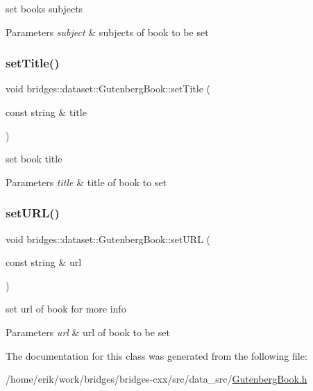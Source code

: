 set book\textquotesingle{}s subjects 
\begin{DoxyParams}{Parameters}
{\em subject} & subjects of book to be set \\
\hline
\end{DoxyParams}
\mbox{\label{classbridges_1_1dataset_1_1_gutenberg_book_a92b2299297a63bb95cb32edb236c29cd}} 
\subsubsection{\texorpdfstring{set\+Title()}{setTitle()}}
{\footnotesize\ttfamily void bridges\+::dataset\+::\+Gutenberg\+Book\+::set\+Title (\begin{DoxyParamCaption}\item[{const string \&}]{title }\end{DoxyParamCaption})\hspace{0.3cm}{\ttfamily [inline]}}

set book title 
\begin{DoxyParams}{Parameters}
{\em title} & title of book to set \\
\hline
\end{DoxyParams}
\mbox{\label{classbridges_1_1dataset_1_1_gutenberg_book_aaa548eeb0e8512f95e3e0ea2bf6d7e9f}} 
\subsubsection{\texorpdfstring{set\+U\+R\+L()}{setURL()}}
{\footnotesize\ttfamily void bridges\+::dataset\+::\+Gutenberg\+Book\+::set\+U\+RL (\begin{DoxyParamCaption}\item[{const string \&}]{url }\end{DoxyParamCaption})\hspace{0.3cm}{\ttfamily [inline]}}

set url of book for more info 
\begin{DoxyParams}{Parameters}
{\em url} & url of book to be set \\
\hline
\end{DoxyParams}


The documentation for this class was generated from the following file\+:\begin{DoxyCompactItemize}
\item 
/home/erik/work/bridges/bridges-\/cxx/src/data\+\_\+src/\hyperlink{_gutenberg_book_8h}{Gutenberg\+Book.\+h}\end{DoxyCompactItemize}
